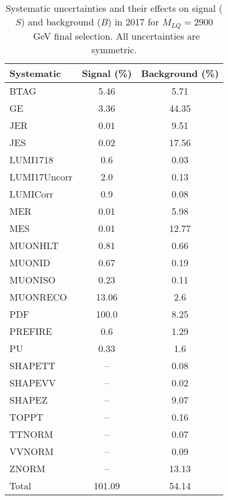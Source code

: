 \begin{table}[htbp]
\begin{center}
\caption{Systematic uncertainties and their effects on signal ($S$) and background ($B$) in 2017 for $M_{LQ}=2900$~GeV final selection. All uncertainties are symmetric.}
\begin{tabular}{lcc}
\hline\hline
Systematic & Signal (\%) & Background (\%) \\ \hline 
BTAG & 5.46 & 5.71\\ 
GE & 3.36 & 44.35\\ 
JER & 0.01 & 9.51\\ 
JES & 0.02 & 17.56\\ 
LUMI1718 & 0.6 & 0.03\\ 
LUMI17Uncorr & 2.0 & 0.13\\ 
LUMICorr & 0.9 & 0.08\\ 
MER & 0.01 & 5.98\\ 
MES & 0.01 & 12.77\\ 
MUONHLT & 0.81 & 0.66\\ 
MUONID & 0.67 & 0.19\\ 
MUONISO & 0.23 & 0.11\\ 
MUONRECO & 13.06 & 2.6\\ 
PDF & 100.0 & 8.25\\ 
PREFIRE & 0.6 & 1.29\\ 
PU & 0.33 & 1.6\\ 
SHAPETT & -- & 0.08\\ 
SHAPEVV & -- & 0.02\\ 
SHAPEZ & -- & 9.07\\ 
TOPPT & -- & 0.16\\ 
TTNORM & -- & 0.07\\ 
VVNORM & -- & 0.09\\ 
ZNORM & -- & 13.13\\ 
Total & 101.09 & 54.14\\ \hline \hline
\end{tabular}
\label{tab:SysUncertainties_uujj_2900}
\end{center}
\end{table}

